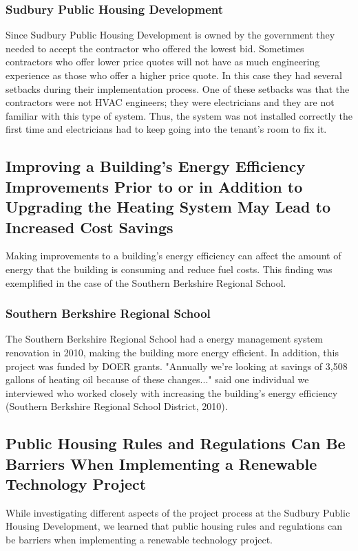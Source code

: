 \subsubsection{Sudbury Public Housing Development}
\par Since Sudbury Public Housing  Development is owned by the government they needed to accept the contractor who offered the lowest bid. Sometimes contractors who offer lower price quotes will not have as much engineering experience as those who offer a higher price quote. In this case they had several setbacks during their implementation process. One of these setbacks was that the contractors were not HVAC engineers; they were electricians and they are not familiar with this type of system. Thus, the system was not installed correctly the first time and electricians had to keep going into the tenant's room to fix it.

\subsection{Improving a Building's Energy Efficiency Improvements Prior to or in Addition to Upgrading the Heating System May Lead to Increased Cost Savings}
\par Making improvements to a building's energy efficiency can affect the amount of energy that the building is consuming and reduce fuel costs. This finding was exemplified in the case of the Southern Berkshire Regional School.

\subsubsection{Southern Berkshire Regional School}
\par The Southern Berkshire Regional School had a energy management system renovation in 2010, making the building more energy efficient. In addition, this project was funded by DOER grants. "Annually we're looking at savings of 3,508 gallons of heating oil because of these changes..." said one individual we interviewed who worked closely with increasing the building's energy efficiency (Southern Berkshire Regional School District, 2010).

\subsection{Public Housing Rules and Regulations Can Be Barriers When Implementing a Renewable Technology Project}
\par While investigating different aspects of the project process at the Sudbury Public Housing Development, we learned that public housing rules and regulations can be barriers when implementing a renewable technology project. 
